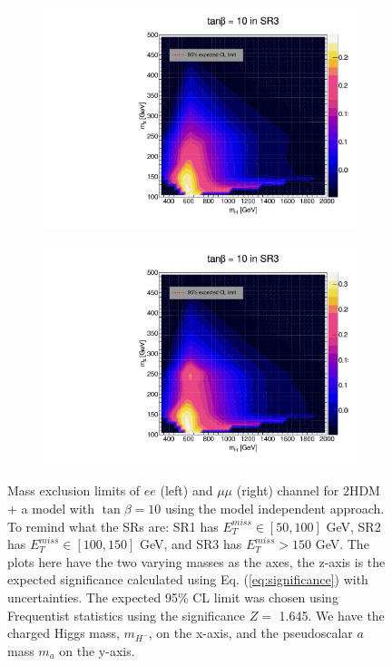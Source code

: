\documentclass[12pt, a4paper]{book}
\begin{document}
\begin{figure}[!ht]
\begin{subfigure}[b]{0.49\textwidth}
      \includegraphics[width=1\textwidth]{Limits/Model_independent/150/2HDM/2HDM_ee_tb10.pdf}
   \end{subfigure}
   \hfill
   \begin{subfigure}[b]{0.49\textwidth}
      \centering
      \includegraphics[width=1\textwidth]{Limits/Model_independent/150/2HDM/2HDM_uu_tb10.pdf}
   \end{subfigure}
   \caption[Expected mass exclusion limits results for 2HDM + a model with $\tan\beta=10$ on $ee$ and $\mu\mu$ channel using the model independent approach]{Mass exclusion limits of $ee$ (left) and $\mu\mu$ (right) channel for 2HDM + a model with $\tan\beta=10$ using the model independent approach. To remind what the SRs are: SR1 has $E_T^{miss}\in[50, 100]$ GeV, SR2 has $E_T^{miss}\in[100, 150]$ GeV, and SR3 has $E_T^{miss}>150$ GeV. The plots here have the two varying masses as the axes, the z-axis is the expected significance calculated using Eq. (\ref{eq:significance}) with uncertainties. The expected 95\% CL limit was chosen using Frequentist statistics using the significance $Z=$ 1.645.   
   We have the charged Higgs mass, $m_{H^-}$, on the x-axis, and the pseudoscalar $a$ mass $m_{a}$ on the y-axis.}
\end{figure}
\end{document}
